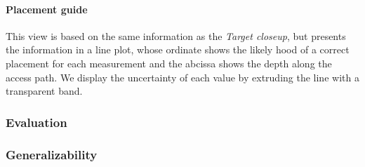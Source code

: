 \paragraph{Placement guide} This view is based on the same information as the \emph{Target closeup}, but presents the information in a line plot, whose ordinate shows the likely hood of a correct placement for each measurement and the abcissa shows the depth along the access path. We display the uncertainty of each value by extruding the line with a transparent band.

\subsubsection{Evaluation}
\label{contributions:medbio:dbs:evaluation}

\subsubsection{Generalizability}
\label{contributions:medbio:dbs:generalizability}


